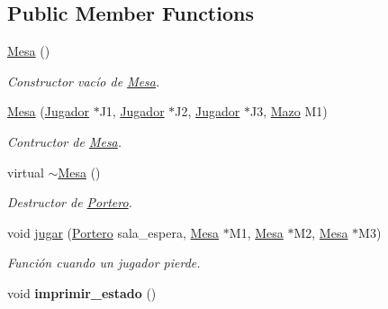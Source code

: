 \subsection*{Public Member Functions}
\begin{DoxyCompactItemize}
\item 
\hypertarget{class_mesa_a98794038db53804cb4295480c96b2c20}{\hyperlink{class_mesa_a98794038db53804cb4295480c96b2c20}{Mesa} ()}\label{class_mesa_a98794038db53804cb4295480c96b2c20}

\begin{DoxyCompactList}\small\item\em Constructor vacío de \hyperlink{class_mesa}{Mesa}. \end{DoxyCompactList}\item 
\hypertarget{class_mesa_adea67ec335ba9969f2e10aa8f8b7832b}{\hyperlink{class_mesa_adea67ec335ba9969f2e10aa8f8b7832b}{Mesa} (\hyperlink{class_jugador}{Jugador} $\ast$J1, \hyperlink{class_jugador}{Jugador} $\ast$J2, \hyperlink{class_jugador}{Jugador} $\ast$J3, \hyperlink{class_mazo}{Mazo} M1)}\label{class_mesa_adea67ec335ba9969f2e10aa8f8b7832b}

\begin{DoxyCompactList}\small\item\em Contructor de \hyperlink{class_mesa}{Mesa}. \end{DoxyCompactList}\item 
\hypertarget{class_mesa_aa0a1b83b8058f80f4f27ec46cc5e9524}{virtual \hyperlink{class_mesa_aa0a1b83b8058f80f4f27ec46cc5e9524}{$\sim$\+Mesa} ()}\label{class_mesa_aa0a1b83b8058f80f4f27ec46cc5e9524}

\begin{DoxyCompactList}\small\item\em Destructor de \hyperlink{class_portero}{Portero}. \end{DoxyCompactList}\item 
void \hyperlink{class_mesa_a05491b7be2de02347201c6aa40daf905}{jugar} (\hyperlink{class_portero}{Portero} sala\+\_\+espera, \hyperlink{class_mesa}{Mesa} $\ast$M1, \hyperlink{class_mesa}{Mesa} $\ast$M2, \hyperlink{class_mesa}{Mesa} $\ast$M3)
\begin{DoxyCompactList}\small\item\em Función cuando un jugador pierde. \end{DoxyCompactList}\item 
\hypertarget{class_mesa_ad4fc44150615ca42473e205fd77e7a4a}{void {\bfseries imprimir\+\_\+estado} ()}\label{class_mesa_ad4fc44150615ca42473e205fd77e7a4a}

\end{DoxyCompactItemize}
